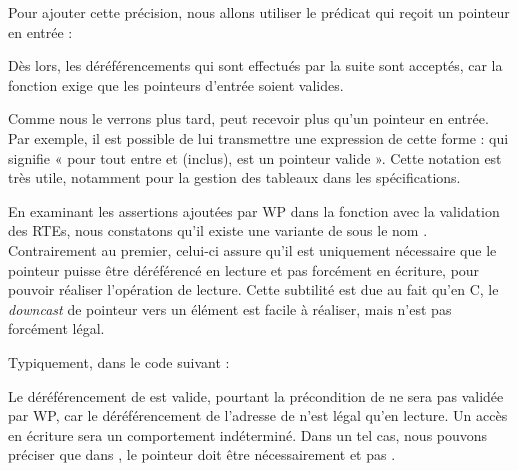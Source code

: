 Pour ajouter cette précision, nous allons utiliser le prédicat  qui
reçoit un pointeur en entrée :






Dès lors, les déréférencements qui sont effectués par la suite sont
acceptés, car la fonction exige que les pointeurs d'entrée soient
valides.



Comme nous le verrons plus tard,  peut recevoir plus qu'un
pointeur en entrée. Par exemple, il est possible de lui transmettre une
expression de cette forme :  qui signifie « pour
tout  entre  et  (inclus),  est un pointeur valide ».
Cette notation est très utile, notamment pour la gestion des tableaux dans les spécifications.



En examinant les assertions ajoutées par WP dans la fonction 
avec la validation des RTEs, nous constatons qu'il existe une variante
de  sous le nom . Contrairement au premier,
celui-ci assure qu'il est uniquement nécessaire que le pointeur puisse
être déréférencé en lecture et pas forcément en écriture, pour pouvoir
réaliser l'opération de lecture. Cette subtilité est due au fait qu'en C, le
\textit{downcast} de pointeur vers un élément  est facile à réaliser, mais
n'est pas forcément légal.



Typiquement, dans le code suivant :






Le déréférencement de  est valide, pourtant la précondition de 
ne sera pas validée par WP, car le déréférencement de l'adresse de 
n'est légal qu'en lecture. Un accès en écriture sera un comportement
indéterminé. Dans un tel cas, nous pouvons préciser que dans , le
pointeur  doit être nécessairement  et pas .






